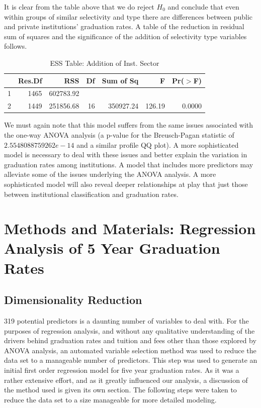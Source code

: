 \documentclass{article}
\begin{document}
It is clear from the table above that we do reject $H_0$ and conclude that even within groups of similar selectivity and type there are differences between public and private institutions' graduation rates. A table of the reduction in residual sum of squares and the significance of the addition of selectivity type variables follows.

\begin{table}[ht]
\centering
\begin{tabular}{lrrrrrr}
  \hline
 & Res.Df & RSS & Df & Sum of Sq & F & Pr($>$F) \\ 
  \hline
1 & 1465 & 602783.92 &  &  &  &  \\ 
  2 & 1449 & 251856.68 & 16 & 350927.24 & 126.19 & 0.0000 \\ 
   \hline
\end{tabular}
\caption{ESS Table: Addition of Inst. Sector} 
\end{table}
\FloatBarrier

We must again note that this model suffers from the same issues associated with the one-way ANOVA analysis (a p-value for the Breusch-Pagan statistic of $2.5548088759262e-14$ and a similar profile QQ plot). A more sophisticated model is necessary to deal with these issues and better explain the variation in graduation rates among institutions. A model that includes more predictors may alleviate some of the issues underlying the ANOVA analysis. A more sophisticated model will also reveal deeper relationships at play that just those between institutional classification and graduation rates.

\section{Methods and Materials:  Regression Analysis of 5 Year Graduation Rates}

\subsection{Dimensionality Reduction}

319 potential predictors is a daunting number of variables to deal with. For the purposes of regression analysis, and without any qualitative understanding of the drivers behind graduation rates and tuition and fees other than those explored by ANOVA analysis, an automated variable selection method was used to reduce the data set to a manageable number of predictors. This step was used to generate an initial first order regression model for five year graduation rates. As it was a rather extensive effort, and as it greatly influenced our analysis, a discussion of the method used is given its own section. The following steps were taken to reduce the data set to a size manageable for more detailed modeling.
\end{document}
